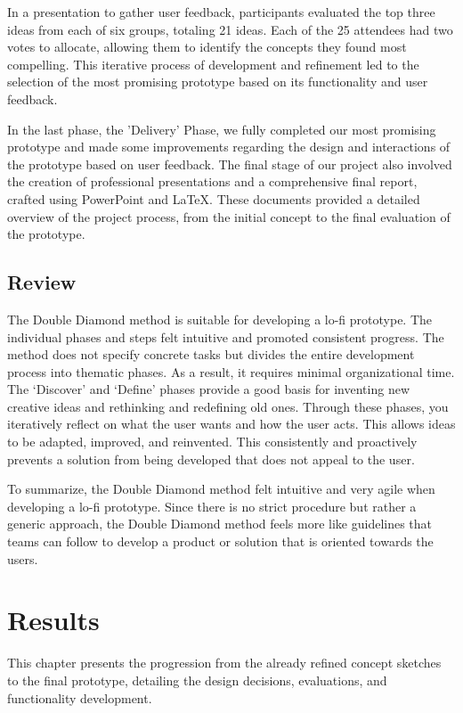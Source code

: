 \documentclass{article}
\begin{document}
In a presentation to gather user feedback, participants evaluated the top three ideas from each of six groups, totaling 21 ideas.
Each of the 25 attendees had two votes to allocate, allowing them to identify the concepts they found most compelling.
This iterative process of development and refinement led to the selection of the most promising prototype
based on its functionality and user feedback.

In the last phase, the 'Delivery' Phase, we fully completed our most promising prototype
and made some improvements regarding the design and interactions of the prototype based on user feedback.
The final stage of our project also involved the creation of professional presentations and a comprehensive final report,
crafted using PowerPoint and LaTeX. These documents provided a detailed overview of the project process,
from the initial concept to the final evaluation of the prototype.

\subsection{Review}
The Double Diamond method is suitable for developing a lo-fi prototype.
The individual phases and steps felt intuitive and promoted consistent progress.
The method does not specify concrete tasks but divides the entire development process into thematic phases.
As a result, it requires minimal organizational time.
The ‘Discover’ and ‘Define’ phases provide a good basis for inventing new creative ideas and rethinking and redefining old ones.
Through these phases, you iteratively reflect on what the user wants and how the user acts.
This allows ideas to be adapted, improved, and reinvented.
This consistently and proactively prevents a solution from being developed that does not appeal to the user.

To summarize, the Double Diamond method felt intuitive and very agile when developing a lo-fi prototype.
Since there is no strict procedure but rather a generic approach,
the Double Diamond method feels more like guidelines that teams can follow to develop a product or solution
that is oriented towards the users.

\section{Results}
This chapter presents the progression from the already refined concept sketches to the final prototype,
detailing the design decisions, evaluations, and functionality development.
\end{document}
